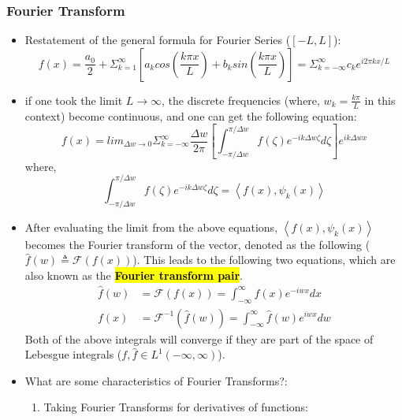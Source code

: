 \documentclass[11.5pt,a4paper]{article}
\begin{document}
\subsubsection*{Fourier Transform}
\begin{itemize}
    \item Restatement of the general formula for Fourier Series ($[-L,L]$):
    \begin{equation*}
        f(x) = \frac{a_0}{2}+\Sigma_{k=1}^\infty \left[ a_kcos\left(\frac{k\pi x}{L}\right) + b_ksin\left(\frac{k\pi x}{L}\right) \right] = \Sigma_{k=-\infty}^\infty c_ke^{i2\pi kx/L}
    \end{equation*}
    \item if one took the limit $L\rightarrow \infty$, the discrete frequencies (where, $w_k = \frac{k\pi}{L}$ in this context) become continuous, and one can get the following equation:
    \begin{equation*}
        f(x) = lim_{\Delta w \rightarrow 0} \Sigma_{k=-\infty}^{\infty} \frac{\Delta w}{2\pi} \left[\int^{\pi/\Delta w}_{-\pi/\Delta w} f(\zeta)e^{-ik\Delta w\zeta} d\zeta \right] e^{ik\Delta wx}
    \end{equation*}
    where, 
    \begin{equation*}
        \int^{\pi/\Delta w}_{-\pi/\Delta w} f(\zeta)e^{-ik\Delta w\zeta} d\zeta = \left<f(x), \psi_k(x) \right>
    \end{equation*}
    \item After evaluating the limit from the above equations, $\left< f(x), \psi_k(x) \right>$ becomes the Fourier transform of the vector, denoted as the following ($\hat{f}(w) \triangleq \mathcal{F}(f(x))$). This leads to the following two equations, which are also known as the \hl{\textbf{Fourier transform pair}}.
    \begin{align*} 
        \hat{f}(w) &= \mathcal{F}(f(x)) = \int^\infty_{-\infty} f(x)e^{-iwx}dx \\
        f(x) &= \mathcal{F}^{-1}(\hat{f}(w)) = \int^\infty_{-\infty} \hat{f}(w)e^{iwx}dw
    \end{align*}
    Both of the above integrals will converge if they are part of the space of Lebesgue integrals ($f,\hat{f} \in L^1(-\infty, \infty)$).
    \item What are some characteristics of Fourier Transforms?:
    \begin{enumerate}
        \item Taking Fourier Transforms for derivatives of functions:
        \begin{itemize}

\end{itemize}
\end{enumerate}
\end{itemize}
\end{document}
